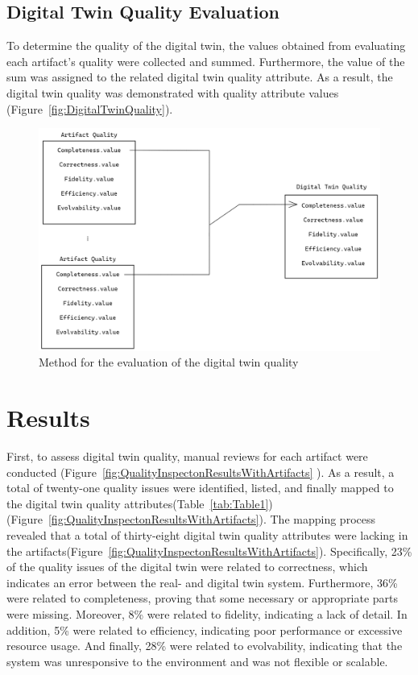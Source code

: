 \documentclass{llncs}
\begin{document}
    \subsection{Digital Twin Quality Evaluation}
    To determine the quality of the digital twin, 
    the values obtained from evaluating each artifact's quality were collected and summed. 
    Furthermore, the value of the sum was assigned to the related digital twin quality attribute. 
    As a result, the digital twin quality was demonstrated with quality attribute values (Figure~\ref{fig:DigitalTwinQuality}).    
  
    \begin{figure}[htbp]
        \includegraphics[scale = 0.25]{DigitalTwinQuality.png}
            \caption{Method for the evaluation of the digital twin quality}
        \label{fig:MethodforDigitalTwinQuality}
    \end{figure}
   
    
    \section{Results}

    First, to assess digital twin quality,
    manual reviews for each artifact were conducted (Figure~\ref{fig:QualityInspectonResultsWithArtifacts} ). 
    As a result, a total of twenty-one quality issues were identified,
    listed, and finally mapped to the digital twin quality attributes(Table~\ref{tab:Table1})(Figure~\ref{fig:QualityInspectonResultsWithArtifacts}).
    The mapping process 
    revealed that a total of thirty-eight digital twin quality attributes were 
    lacking in the artifacts(Figure~\ref{fig:QualityInspectonResultsWithArtifacts}).  
    Specifically, 23\% of the quality issues of the digital twin were related to correctness, 
    which indicates an error between the real- and digital twin system. Furthermore, 36\%  were related 
    to completeness, proving that some necessary or appropriate parts were missing.
    Moreover, 8\%  were related to fidelity, indicating a lack of detail. 
    In addition, 5\%  were related to efficiency, indicating poor performance or excessive resource usage.
    And finally, 28\% were related to evolvability, indicating that the system was unresponsive 
    to the environment and was not flexible or scalable.  
\end{document}
